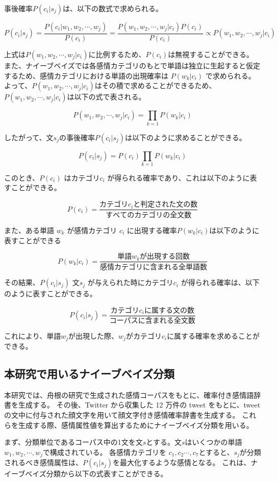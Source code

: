 \documentclass[11pt,a4j]{jsarticle}
\begin{document}
事後確率$P(c_i|s_j)$は、以下の数式で求められる。

\[
P(c_i|s_j)=\frac{P(c_i|w_1,w_2, \cdots ,w_j)}{P(c_i)}=\frac{P(w_1,w_2, \cdots ,w_j|c_i)P(c_i)}{P(c_i)} \propto P(w_1,w_2, \cdots ,w_j|c_i)
\]

上式は$P(w_1,w_2, \cdots ,w_j|c_i)$に比例するため、$P(c_i)$は無視することができる。
また、ナイーブベイズでは各感情カテゴリのもとで単語は独立に生起すると仮定するため、感情カテゴリにおける単語の出現確率は $P(w_k|c_i)$ で求められる。よって、$P(w_1,w_2, \cdots ,w_j|c_i)$はその積で求めることができるため、$P(w_1,w_2, \cdots ,w_j|c_i)$は以下の式で表される。

\[
P(w_1,w_2, \cdots ,w_j|c_i)=\prod_{k=1}P(w_k|c_i)
\]


したがって、文$s_j$の事後確率$P(c_i|s_j)$は以下のように求めることができる。

\[
P(c_i|s_j)=P(c_i)\prod_{k=1}P(w_k|c_i)
\]

このとき、$P(c_i)$ はカテゴリ$c_i$ が得られる確率であり、これは以下のように表すことができる。

\[
P(c_i)=\frac{カテゴリc_i と判定された文の数}{すべてのカテゴリの全文数}
\]

また、ある単語 $w_k$ が感情カテゴリ $c_i$ に出現する確率$P(w_k|c_i)$は以下のように表すことができる

\[
P(w_k|c_i)=\frac{単語 w_k が出現する回数}{感情カテゴリに含まれる全単語数}
\]

その結果、$P(c_i|s_j)$ 文$s_j$ が与えられた時にカテゴリ$c_i$ が得られる確率は、以下のように表すことができる。

\[
P(c_i|s_j)=\frac{カテゴリc_i に属する文の数}{コーパスに含まれる全文数}
\]

これにより、単語$w_j$が出現した際、$w_j$がカテゴリ$c_i$に属する確率を求めることができる。


  \subsection{本研究で用いるナイーブベイズ分類}\label{sec:thesisnaivebayes}
本研究では、舟根の研究で生成された感情コーパスをもとに、確率付き感情語辞書を生成する。
その後、Twitter から収集した 12 万件の tweet をもとに、tweet の文中に付与された顔文字を用いて顔文字付き感情確率辞書を生成する。
これらを生成する際、感情属性値を算出するためにナイーブベイズ分類を用いる。


まず、分類単位であるコーパス中の1文を文$s$とする。文$s$はいくつかの単語$w_1,w_2, \cdots ,w_j$で構成されている。
各感情カテゴリを $c_1,c_2 \cdots ,c_7$とすると、$s_j$が分類されるべき感情属性は、$P(c_i|s_j)$を最大化するような感情となる。
これは、ナイーブベイズ分類から以下の式表すことができる。
\end{document}
